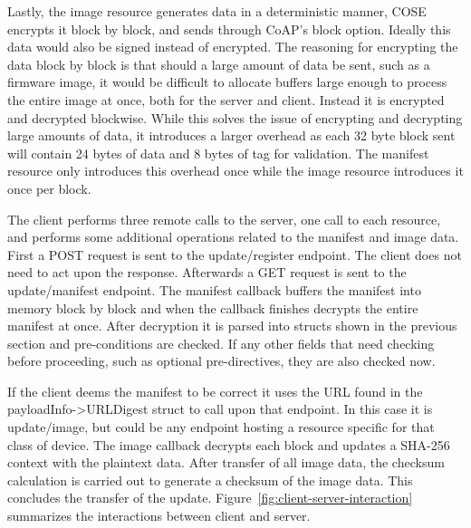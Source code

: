 \documentclass[0-thesis.tex]{subfiles}
\begin{document}
Lastly, the image resource generates data in a deterministic manner, COSE encrypts it
block by block, and sends through CoAP's block option. Ideally this data would also be
signed instead of encrypted. The reasoning for encrypting the data block by block is that
should a large amount of data be sent, such as a firmware image, it would be difficult to
allocate buffers large enough to process the entire image at once, both for the server and
client. Instead it is encrypted and decrypted blockwise. While this solves the issue of
encrypting and decrypting large amounts of data, it introduces a larger overhead as each
32 byte block sent will contain 24 bytes of data and 8 bytes of tag for validation. The
manifest resource only introduces this overhead once while the image resource introduces
it once per block.

The client performs three remote calls to the server, one call to each resource, and
performs some additional operations related to the manifest and image data. First a POST
request is sent to the update/register endpoint. The client does not need to act upon the
response. Afterwards a GET request is sent to the update/manifest endpoint. The manifest
callback buffers the manifest into memory block by block and when the callback finishes
decrypts the entire manifest at once. After decryption it is parsed into structs shown in
the previous section and pre-conditions are checked. If any other fields that need
checking before proceeding, such as optional pre-directives, they are also checked now. 

If the client deems the manifest to be correct it uses the URL found in the
payloadInfo->URLDigest struct to call upon that endpoint. In this case it is update/image,
but could be any endpoint hosting a resource specific for that class of device. The image
callback decrypts each block and updates a SHA-256 context with the plaintext data. After
transfer of all image data, the checksum calculation is carried out to generate a checksum
of the image data. This concludes the transfer of the update.
Figure~\ref{fig:client-server-interaction} summarizes the interactions between client and
server.
\end{document}
